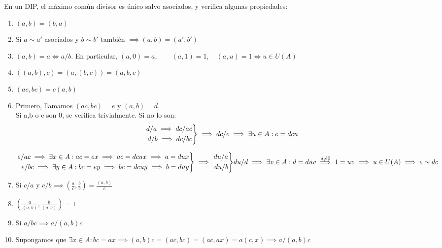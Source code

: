 \documentclass[11pt, a4paper, titlepage]{article}
\makeatletter
\renewenvironment{proof}[1][\proofname] {\vspace{-15pt}\par\pushQED{\qed}\normalfont\topsep6\p@\@plus6\p@\relax\trivlist\item[\hskip\labelsep\it#1\@addpunct{.}]\ignorespaces}{\popQED\endtrivlist\@endpefalse}
\theoremstyle{theorem-style}
\theoremstyle{definition-style}
\theoremstyle{remark-style}
\theoremstyle{example-style}
\newenvironment{nlist}
{\begin{enumerate}
\renewcommand\labelenumi{(\emph{\roman{enumi})}}}
{\end{enumerate}}
\newenvironment{rcases}
  {\left.\begin{aligned}}
  {\end{aligned}\right\rbrace}
\makeatother
\begin{document}
En un DIP, el máximo común divisor es único salvo asociados, y verifica algunas propiedades:
\begin{nlist}

	\item $(a,b) = (b,a)$
	
	\item Si $a \sim a'$ asociados y $b \sim b'$ también $\implies (a,b) = (a',b')$
	
	\item $(a,b) = a \iff a/b$. En particular, $(a,0) = a, \quad  \quad (a,1) = 1, \quad (a,u) = 1 \iff u \in U(A)$
	
	\item $((a,b),c) = (a,(b,c)) = (a,b,c)$
	\item $(ac,bc) = c(a,b)$\\
	\begin{proof}
	Primero, llamamos $(ac,bc) = e$ y $(a,b) = d$.\\
	Si a,b o c son 0, se verifica trivialmente. Si no lo son:\\
	\[
	\begin{rcases}
	d/a \implies dc/ac\\
	d/b \implies dc/bc\\
\end{rcases} \implies dc/e \implies \exists u \in A : e = dcu
	\]
	
	$\begin{rcases}e / ac \implies \exists x \in A : ac = ex \implies ac = dcux \implies a = dux\\
	e/bc\implies \exists y \in A : bc = ey \implies bc = dcuy \implies b = duy\end{rcases} \implies \begin{rcases}du/a\\du/b\end{rcases} du/d \\\implies \exists v \in A : d = duv \stackrel{d\ne 0}{\implies} 1=uv \implies u\in U(A) \implies e \sim  dc$

	
\end{proof}

	\item Si $c/a$ y $c/b\implies \left(\frac{a}{c},\frac{b}{c}\right) =  \frac{(a,b)}{c}$
	
	\item
	$\left(\frac{a}{(a,b)}, \frac{b}{(a,b)}\right) = 1$
	
	\item Si $a/bc \implies a/(a,b)c$\\
	\begin{proof}
	Supongamos que $\exists x \in A : bc = ax  \implies (a,b)c = (ac,bc) = (ac,ax) = a(c,x) \implies a/(a,b)c$
	

\end{proof}
\end{nlist}
\end{document}
